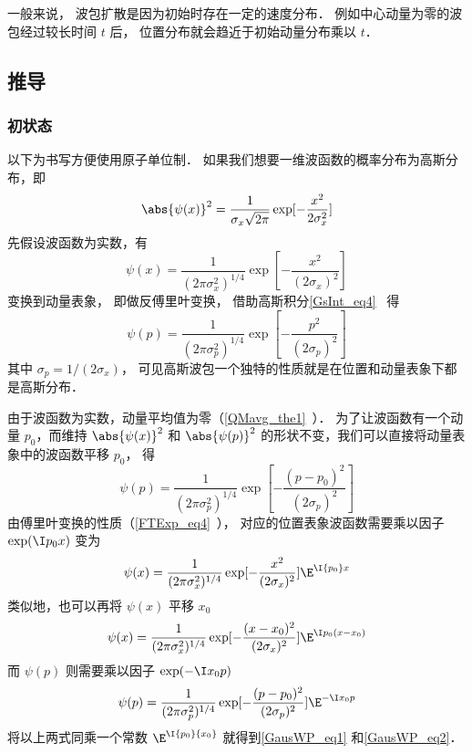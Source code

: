 一般来说， 波包扩散是因为初始时存在一定的速度分布． 例如中心动量为零的波包经过较长时间 $t$ 后， 位置分布就会趋近于初始动量分布乘以 $t$．

\subsection{推导}
\subsubsection{初状态}

以下为书写方便使用原子单位制． 如果我们想要一维波函数的概率分布为高斯分布，即
\begin{equation}
\abs{\psi (x)}^2 = \frac{1}{\sigma_x \sqrt{2\pi}} \exp[-\frac{x^2}{2\sigma_x^2}]
\end{equation}
先假设波函数为实数，有
\begin{equation}
\psi (x) = \frac{1}{(2\pi\sigma_x^2)^{1/4}} \exp[-\frac{x^2}{(2\sigma_x)^2}]
\end{equation}
变换到动量表象， 即做反傅里叶变换， 借助高斯积分\autoref{GsInt_eq4}~ 得
\begin{equation}
\psi(p) = \frac{1}{(2\pi\sigma_p^2)^{1/4}} \exp[-\frac{p^2}{(2\sigma_p)^2}]
\end{equation}
其中 $\sigma_p = 1/(2\sigma_x)$， 可见高斯波包一个独特的性质就是在位置和动量表象下都是高斯分布．

由于波函数为实数，动量平均值为零（\autoref{QMavg_the1}~）． 为了让波函数有一个动量 $p_0$，而维持 $\abs{\psi(x)}^2$ 和 $\abs{\psi(p)}^2$ %
的形状不变，我们可以直接将动量表象中的波函数平移 $p_0$， 得
\begin{equation}
\psi (p) = \frac{1}{(2\pi\sigma_p^2)^{1/4}} \exp[-\frac{(p - p_0)^2}{(2\sigma_p)^2}]
\end{equation}
由傅里叶变换的性质（\autoref{FTExp_eq4}~）， 对应的位置表象波函数需要乘以因子 $\exp(\I p_0 x)$ 变为
\begin{equation}
\psi(x) = \frac{1}{(2\pi\sigma_x^2)^{1/4}} \exp[-\frac{x^2}{(2\sigma_x)^2}] {\E^{\I {p_0}x}}
\end{equation}
类似地，也可以再将 $\psi(x)$ 平移 $x_0$ 
\begin{equation}
\psi (x) = \frac{1}{(2\pi\sigma_x^2)^{1/4}} \exp[-\frac{(x-x_0)^2}{(2\sigma_x)^2}] \E^{\I p_0 (x-x_0)}
\end{equation}
而 $\psi(p)$ 则需要乘以因子 $\exp (-\I x_0 p)$
\begin{equation}\label{GausWP_eq3}
\psi(p) = \frac{1}{(2\pi\sigma_p^2)^{1/4}} \exp[-\frac{(p - p_0)^2}{(2\sigma_p)^2}] \E^{-\I x_0 p}
\end{equation}
将以上两式同乘一个常数%
 ${\E^{\I{p_0}{x_0}}}$ 就得到\autoref{GausWP_eq1} 和\autoref{GausWP_eq2}．

